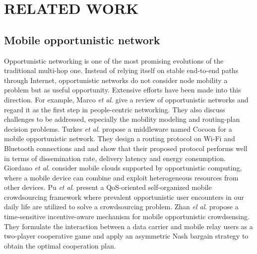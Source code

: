 \documentclass[journal]{IEEEtran}
\begin{document}
\section{RELATED WORK}

\subsection{Mobile opportunistic network}
Opportunistic networking is one of the most promising evolutions of the traditional multi-hop one. 
Instead of relying itself on stable end-to-end paths through Internet, opportunistic networks do not consider node mobility a problem but as useful opportunity. 
Extensive efforts have been made into this direction. For example, Marco \emph{et al}. \cite{Conti2014} give a review of opportunistic networks and regard it as the first step in people-centric networking. They also discuss challenges to be addressed, especially the mobility modeling and routing-plan decision problems.
Turkes \emph{et al}. \cite{turkes2016cocoon} propose a middleware named Cocoon for a mobile opportunistic network. They design a routing protocol on Wi-Fi and Bluetooth connections and and show that their proposed protocol performs well in terms of dissemination rate, delivery latency and energy consumption.
Giordano \emph{et al}. \cite{giordano2011human} consider mobile clouds supported by opportunistic computing, where a mobile device can combine and exploit heterogeneous resources from other devices.
Pu \emph{et al}. \cite{Pu2017crowd} present a QoS-oriented self-organized mobile crowdsourcing framework where prevalent opportunistic user encounters in our daily life are utilized to solve a crowdsourcing problem.
Zhan \emph{el al}. \cite{zhan2017time} propose a time-sensitive incentive-aware mechanism for mobile opportunistic crowdsensing. They formulate the interaction between a data carrier and mobile relay users as a two-player cooperative game and apply an asymmetric Nash bargain strategy to obtain the optimal cooperation plan.
\end{document}
